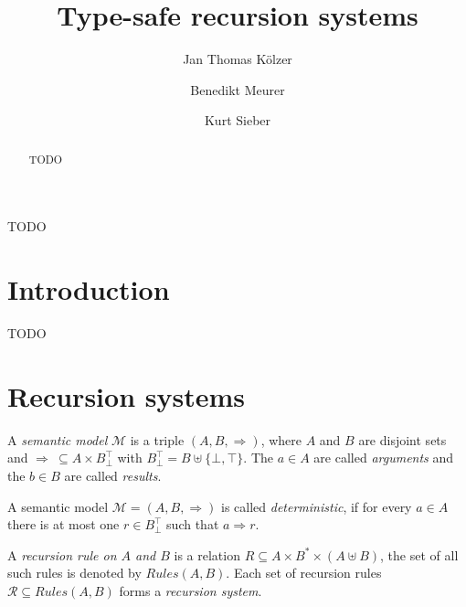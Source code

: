 \documentclass[a4paper,final,preprint,sort&compress]{elsarticle}
\newcommand{\M}{\ensuremath{\mathcal{M}}}
\newcommand{\R}{\ensuremath{\mathcal{R}}}
\newcommand{\Rules}{\ensuremath{\mathit{Rules}}}
\begin{document}
\begin{frontmatter}

\title{Type-safe recursion systems}

\author[fnt]{Jan Thomas K\"olzer}
\author[cus]{Benedikt Meurer}
\author[cus]{Kurt Sieber}
\address[fnt]{Naturwissenschaftlich-Technische Fakult\"at, Universit\"at Siegen, D-57068 Siegen, Germany}
\address[cus]{Compilerbau und Softwareanalyse, Universit\"at Siegen, D-57068 Siegen, Germany}

\begin{abstract}
  TODO
\end{abstract}

\begin{keyword}
  TODO
\end{keyword}

\end{frontmatter}


\section{Introduction}
\label{sec:Introduction}


TODO


\section{Recursion systems}
\label{sec:Recursion_systems}


A \emph{semantic model} $\M$ is a triple $(A,B,\Rightarrow)$, where $A$ and $B$ are disjoint sets
and \mbox{$\Rightarrow~\subseteq A \times B_\bot^\top$} with $B_\bot^\top = B \uplus \{\bot,\top\}$. The $a \in A$
are called \emph{arguments} and the $b \in B$ are called \emph{results}.

\begin{definition}
  A semantic model $\M = (A,B,\Rightarrow)$ is called \emph{deterministic}, if for every $a \in A$
  there is at most one $r \in B_\bot^\top$ such that $a \Rightarrow r$.
\end{definition}

A \emph{recursion rule on $A$ and $B$} is a relation $R \subseteq A \times B^* \times (A \uplus B)$, the set
of all such rules is denoted by $\Rules(A,B)$. Each set of recursion rules \mbox{$\R \subseteq \Rules(A,B)$} forms a
\emph{recursion system}.
\end{document}
